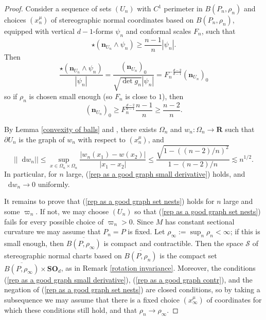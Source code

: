 \documentclass[reqno,10pt]{amsart}
\newcommand{\RR}{\mathbf{R}}
\newcommand{\SpOrth}{\mathbf{SO}}
\newcommand*\dif{\mathop{}\!\mathrm{d}}
\newcommand{\normal}{\mathbf n}
\theoremstyle{definition}
\numberwithin{equation}{section}
\begin{document}
\begin{proof}
Consider a sequence of sets $(U_n)$ with $C^1$ perimeter in $B(P_n, \rho_n)$ and choices $(x^\mu_n)$ of stereographic normal coordinates based on $B(P_n, \rho_n)$, equipped with vertical $d-1$-forms $\psi_n$ and conformal scales $F_n$, such that 
\begin{equation}\label{rep as a good graph contr}
\star(\normal_{U_n} \wedge \psi_n) \geq \frac{n - 1}{n} |\psi_n|.
\end{equation}
Then 
$$\frac{\star(\normal_{U_n} \wedge \psi_n)}{|\psi_n|} = \frac{(\normal_{U_n})_0}{\sqrt{\det g_n} |\psi_n|} = F_n^{-\frac{d - 2}{d - 1}} (\normal_{U_n})_0$$
so if $\rho_n$ is chosen small enough (so $F_n$ is close to $1$), then
\begin{equation}\label{rep as a good graph good normal vector}
(\normal_{U_n})_0 \geq F^{\frac{d - 2}{d - 1}}_n \frac{n - 1}{n} \geq \frac{n - 2}{n}.
\end{equation}

By Lemma \ref{convexity of balls} and \cite[Theorem 4.8]{Giusti77}, there exists $\Omega_n$ and $w_n: \Omega_n \to \RR$ such that $\partial U_n$ is the graph of $w_n$ with respect to $(x^\mu_n)$, and
$$||\dif w_n|| \leq \sup_{x \in \Omega_n \times \Omega_n} \frac{|w_n(x_1) - w(x_2)|}{|x_1 - x_2|} \leq \frac{\sqrt{1 - ((n - 2)/n)^2}}{1 - (n - 2)/n} \lesssim n^{1/2}.$$
In particular, for $n$ large, (\ref{rep as a good graph small derivative}) holds, and $\dif w_n \to 0$ uniformly.

It remains to prove that (\ref{rep as a good graph set nests}) holds for $n$ large and some $\varpi_n$.
If not, we may choose $(U_n)$ so that (\ref{rep as a good graph set nests}) fails for every possible choice of $\varpi_n > 0$.
Since $M$ has constant sectional curvature we may assume that $P_n = P$ is fixed.
Let $\rho_\infty := \sup_n \rho_n < \infty$; if this is small enough, then $\overline{B(P, \rho_\infty)}$ is compact and contractible.
Then the space $\mathscr S$ of stereographic normal charts based on $\overline{B(P, \rho_n)}$ is the compact set $\overline{B(P, \rho_\infty)} \times \SpOrth_d$, as in Remark \ref{rotation invariance}.
Moreover, the conditions (\ref{rep as a good graph small derivative}), (\ref{rep as a good graph contr}), and the negation of (\ref{rep as a good graph set nests}) are closed conditions, so by taking a subsequence we may assume that there is a fixed choice $(x^\mu_\infty)$ of coordinates for which these conditions still hold, and that $\rho_n \to \rho_\infty$.


\end{proof}
\end{document}
